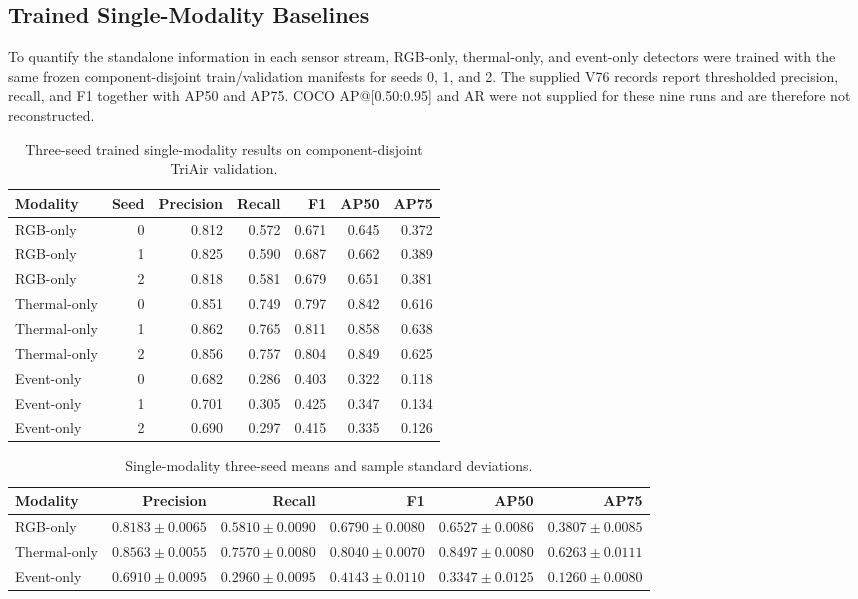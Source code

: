 \subsection{Trained Single-Modality Baselines}
To quantify the standalone information in each sensor stream, RGB-only, thermal-only, and event-only detectors were trained with the same frozen component-disjoint train/validation manifests for seeds 0, 1, and 2. The supplied V76 records report thresholded precision, recall, and F1 together with AP50 and AP75. COCO AP@[0.50:0.95] and AR were not supplied for these nine runs and are therefore not reconstructed.

\begin{table}[t]
\centering
\caption{Three-seed trained single-modality results on component-disjoint TriAir validation.}
\label{tab:single-modal-seeds}
\scriptsize
\begin{tabular}{@{}lrrrrrr@{}}
\toprule
Modality & Seed & Precision & Recall & F1 & AP50 & AP75\\
\midrule
RGB-only & 0 & 0.812 & 0.572 & 0.671 & 0.645 & 0.372\\
RGB-only & 1 & 0.825 & 0.590 & 0.687 & 0.662 & 0.389\\
RGB-only & 2 & 0.818 & 0.581 & 0.679 & 0.651 & 0.381\\
Thermal-only & 0 & 0.851 & 0.749 & 0.797 & 0.842 & 0.616\\
Thermal-only & 1 & 0.862 & 0.765 & 0.811 & 0.858 & 0.638\\
Thermal-only & 2 & 0.856 & 0.757 & 0.804 & 0.849 & 0.625\\
Event-only & 0 & 0.682 & 0.286 & 0.403 & 0.322 & 0.118\\
Event-only & 1 & 0.701 & 0.305 & 0.425 & 0.347 & 0.134\\
Event-only & 2 & 0.690 & 0.297 & 0.415 & 0.335 & 0.126\\
\bottomrule
\end{tabular}
\end{table}

\begin{table}[t]
\centering
\caption{Single-modality three-seed means and sample standard deviations.}
\label{tab:single-modal-summary}
\scriptsize
\setlength{\tabcolsep}{3pt}
\begin{tabular}{@{}lrrrrr@{}}
\toprule
Modality & Precision & Recall & F1 & AP50 & AP75\\
\midrule
RGB-only & $0.8183\pm0.0065$ & $0.5810\pm0.0090$ & $0.6790\pm0.0080$ & $0.6527\pm0.0086$ & $0.3807\pm0.0085$\\
Thermal-only & $\mathbf{0.8563\pm0.0055}$ & $\mathbf{0.7570\pm0.0080}$ & $\mathbf{0.8040\pm0.0070}$ & $\mathbf{0.8497\pm0.0080}$ & $\mathbf{0.6263\pm0.0111}$\\
Event-only & $0.6910\pm0.0095$ & $0.2960\pm0.0095$ & $0.4143\pm0.0110$ & $0.3347\pm0.0125$ & $0.1260\pm0.0080$\\
\bottomrule
\end{tabular}
\end{table}


